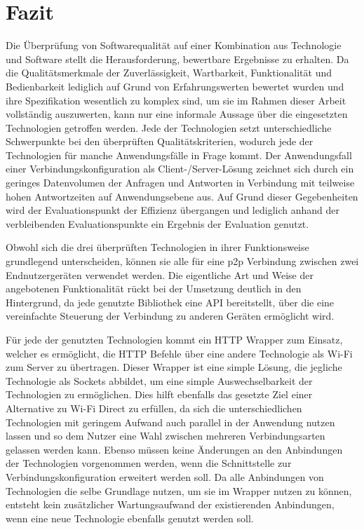 \section{Fazit}

Die Überprüfung von Softwarequalität auf einer Kombination aus Technologie und Software stellt die Herausforderung, bewertbare Ergebnisse zu erhalten. Da die Qualitätsmerkmale der Zuverlässigkeit, Wartbarkeit, Funktionalität und Bedienbarkeit lediglich auf Grund von Erfahrungswerten bewertet wurden und ihre Spezifikation wesentlich zu komplex sind, um sie im Rahmen dieser Arbeit vollständig auszuwerten, kann nur eine informale Aussage über die eingesetzten Technologien getroffen werden. Jede der Technologien setzt unterschiedliche Schwerpunkte bei den überprüften Qualitätskriterien, wodurch jede der Technologien für manche Anwendungsfälle in Frage kommt. Der Anwendungsfall einer Verbindungskonfiguration als Client-/Server-Lösung zeichnet sich durch ein geringes Datenvolumen der Anfragen und Antworten in Verbindung mit teilweise hohen Antwortzeiten auf Anwendungsebene aus. Auf Grund dieser Gegebenheiten wird der Evaluationspunkt der Effizienz übergangen und lediglich anhand der verbleibenden Evaluationspunkte ein Ergebnis der Evaluation genutzt.

Obwohl sich die drei überprüften Technologien in ihrer Funktionsweise grundlegend unterscheiden, können sie alle für eine p2p Verbindung zwischen zwei Endnutzergeräten verwendet werden. Die eigentliche Art und Weise der angebotenen Funktionalität rückt bei der Umsetzung deutlich in den Hintergrund, da jede genutzte Bibliothek eine API bereitstellt, über die eine vereinfachte Steuerung der Verbindung zu anderen Geräten ermöglicht wird.

Für jede der genutzten Technologien kommt ein HTTP Wrapper zum Einsatz, welcher es ermöglicht, die HTTP Befehle über eine andere Technologie als Wi-Fi zum Server zu übertragen. Dieser Wrapper ist eine simple Lösung, die jegliche Technologie als Sockets abbildet, um eine simple Auswechselbarkeit der Technologien zu ermöglichen. Dies hilft ebenfalls das gesetzte Ziel einer Alternative zu Wi-Fi Direct zu erfüllen, da sich die unterschiedlichen Technologien mit geringem Aufwand auch parallel in der Anwendung nutzen lassen und so dem Nutzer eine Wahl zwischen mehreren Verbindungsarten gelassen werden kann. Ebenso müssen keine Änderungen an den Anbindungen der Technologien vorgenommen werden, wenn die Schnittstelle zur Verbindungskonfiguration erweitert werden soll. Da alle Anbindungen von Technologien die selbe Grundlage nutzen, um sie im Wrapper nutzen zu können, entsteht kein zusätzlicher Wartungsaufwand der existierenden Anbindungen, wenn eine neue Technologie ebenfalls genutzt werden soll.

